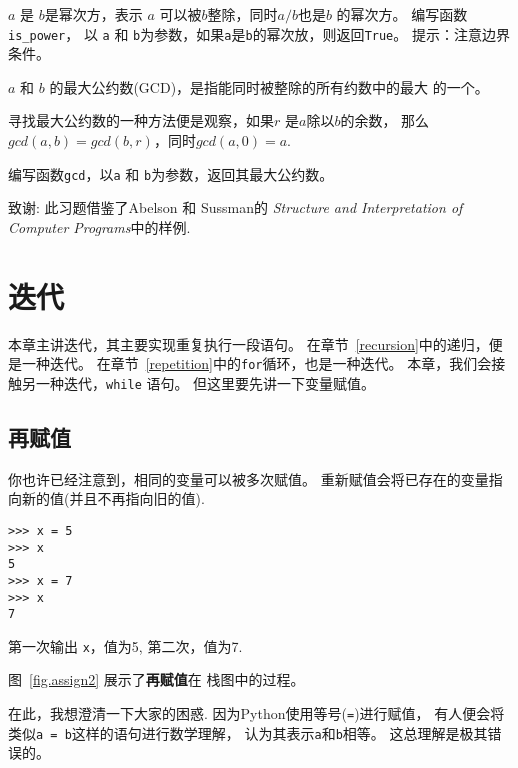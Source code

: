 \documentclass[10pt]{book}
\begin{document}
\begin{exercise}

$a$ 是 $b$是幂次方，表示 $a$ 可以被$b$整除，同时$a/b$也是$b$ 的幂次方。
编写函数\verb"is_power"，
以 {\tt a} 和 {\tt b}为参数，如果{\tt a}是{\tt b}的幂次放，则返回{\tt True}。
提示：注意边界条件。

\end{exercise}


\begin{exercise}

 $a$ 和 $b$ 的最大公约数(GCD)，是指能同时被整除的所有约数中的最大
的一个。

寻找最大公约数的一种方法便是观察，如果$r$ 是$a$除以$b$的余数，
那么$gcd(a, b) = gcd(b, r)$，同时$gcd(a, 0) = a$.

编写函数\verb"gcd"，以{\tt a} 和 {\tt b}为参数，返回其最大公约数。


致谢: 此习题借鉴了Abelson 和
Sussman的 {\em Structure and Interpretation of Computer Programs}中的样例.

\end{exercise}


\chapter{迭代}

本章主讲迭代，其主要实现重复执行一段语句。
在章节~\ref{recursion}中的递归，便是一种迭代。
在章节~\ref{repetition}中的{\tt for}循环，也是一种迭代。
本章，我们会接触另一种迭代，{\tt while} 语句。
但这里要先讲一下变量赋值。

\section{再赋值}

你也许已经注意到，相同的变量可以被多次赋值。
重新赋值会将已存在的变量指向新的值(并且不再指向旧的值).

\begin{verbatim}
>>> x = 5
>>> x
5
>>> x = 7
>>> x
7
\end{verbatim}
%
第一次输出{ \tt x}，值为5, 第二次，值为7.

图~\ref{fig.assign2}  展示了{\bf 再赋值}在
栈图中的过程。 

在此，我想澄清一下大家的困惑.
因为Python使用等号({\tt =})进行赋值，
有人便会将类似{\tt a = b}这样的语句进行数学理解，
认为其表示{\tt a}和{\tt b}相等。
这总理解是极其错误的。
\end{document}
